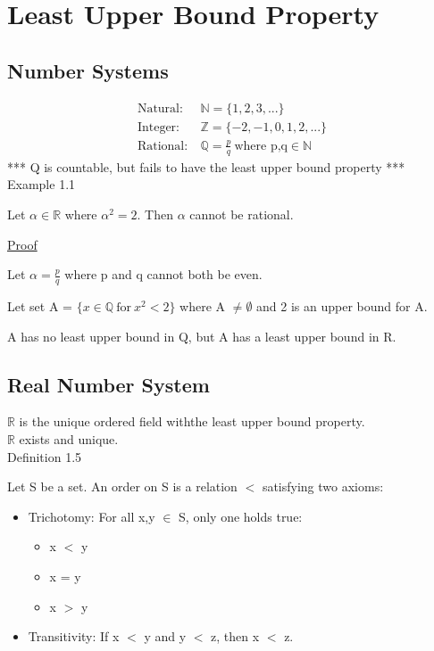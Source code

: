 \newpage
\section[Day 1: The Real Number System]{Least Upper Bound Property}

\subsection{Number Systems}

\begin{align*}
	\text{Natural}:\ & \mathbb{N} = \{1, 2, 3, ... \} \\
	\text{Integer}:\ & \mathbb{Z} = \{-2, -1, 0, 1, 2, ... \} \\
	\text{Rational}:\ & \mathbb{Q} = \frac{p}{q} \ \text{where p,q} \in \mathbb{N}
\end{align*}
*** Q is countable, but fails to have the least upper bound property *** \\

{ \color{red} Example 1.1 }

\qquad Let $ \alpha \in \mathbb{R} $ where $ \alpha^2 = 2 $. Then $ \alpha $ cannot be rational.

{ \color{magenta} \underline{Proof} }

Let $ \alpha = \frac{p}{q} $ where p and q cannot both be even.

Let set A = $\{ x \in \mathbb{Q} \ \text{for} \ x^2 < 2 \} $ where A $ \neq \emptyset $
and 2 is an upper bound for A.

A has no least upper bound in Q, but A has a least upper bound in R.

\subsection{Real Number System}

$ \mathbb{R} $ is the unique ordered field withthe least upper bound property. \\
$ \mathbb{R} $ exists and unique. \\

{ \color{blue} Definition 1.5 }

\qquad Let S be a set. An order on S is a relation $<$ satisfying two axioms:

\begin{itemize}
	\item Trichotomy: For all x,y $ \in $ S, only one holds true:
		\begin{itemize}
			\item x $<$ y
			\item x = y
			\item x $>$ y
		\end{itemize}
	\item Transitivity: If x $<$ y and y $<$ z, then x $<$ z.
\end{itemize}

